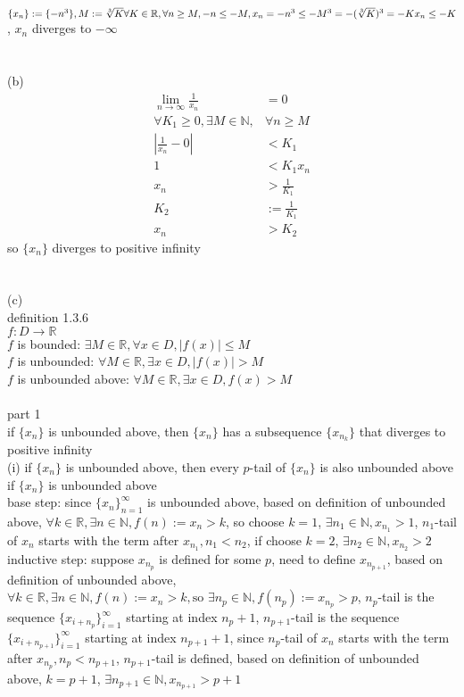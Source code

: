 \documentclass[12pt, border = 4pt, multi]{article} %
\begin{document}
$\{x_n\} := \{-n ^ 3\}, M := \sqrt[3]{K}\\
\forall K \in \mathbb{R}, \forall n \geq M, -n \leq -M, x_n = -n ^ 3 \leq -M ^ 3 = -(\sqrt[3]{K}) ^ 3 = -K\\
x_n \leq -K$, $x_n$ diverges to $-\infty$\\
\\
\\
(b)\\
\begin{align*}
\lim_{n \rightarrow \infty} \frac{1}{x_n} &= 0\\
\forall K_1 \geq 0, \exists M \in \mathbb{N}, &\forall n \geq M\\
\left|\frac{1}{x_n} - 0\right| &< K_1\\
1 &< K_1 x_n\\
x_n &> \frac{1}{K_1}\\
K_2 &:= \frac{1}{K_1}\\
x_n &> K_2
\end{align*}
so $\{x_n\}$ diverges to positive infinity\\
\\
\\
(c)\\
definition 1.3.6\\
$f: D \rightarrow \mathbb{R}$\\
$f$ is bounded: $\exists M \in \mathbb{R}, \forall x \in D, |f(x)| \leq M$\\
$f$ is unbounded: $\forall M \in \mathbb{R}, \exists x \in D, |f(x)| > M$\\
$f$ is unbounded above: $\forall M \in \mathbb{R}, \exists x \in D, f(x) > M$\\
\\
part 1\\
if $\{x_n\}$ is unbounded above, then $\{x_n\}$ has a subsequence $\{x_{n_k}\}$ that diverges to positive infinity\\
(i) if $\{x_n\}$ is unbounded above, then every $p$-tail of $\{x_n\}$ is also unbounded above\\
if $\{x_n\}$ is unbounded above\\
base step: since $\{x_n\}_{n = 1} ^ {\infty}$ is unbounded above,  based on definition of unbounded above, $\forall k \in \mathbb{R}, \exists n \in \mathbb{N}, f(n) := x_n > k$, so choose $k = 1$, $\exists n_1 \in \mathbb{N}, x_{n_1} > 1$, $n_1$-tail of $x_n$ starts with the term after $x_{n_1}, n_1 < n_2$, if choose $k = 2$, $\exists n_2 \in \mathbb{N}, x_{n_2} > 2$\\
inductive step: suppose $x_{n_p}$ is defined for some $p$, need to define $x_{n_{p + 1}}$, based on definition of unbounded above, $\forall k \in \mathbb{R}, \exists n \in \mathbb{N}, f(n) := x_n > k, \text{so }\exists n_p \in \mathbb{N}, f(n_p) := x_{n_p} > p$, $n_p$-tail is the sequence $\{x_{i + n_p}\}_{i = 1} ^ {\infty}$ starting at index $n_p + 1$, $n_{p + 1}$-tail is the sequence $\{x_{i + n_{p + 1}}\}_{i = 1} ^ {\infty}$ starting at index $n_{p + 1} + 1$, since $n_p$-tail of $x_n$ starts with the term after $x_{n_p}, n_p < n_{p + 1}$, $n_{p + 1}$-tail is defined, based on definition of unbounded above, $k = p + 1$, $\exists n_{p + 1} \in \mathbb{N}, x_{n_{p + 1}} > p + 1$\\
\end{document}
